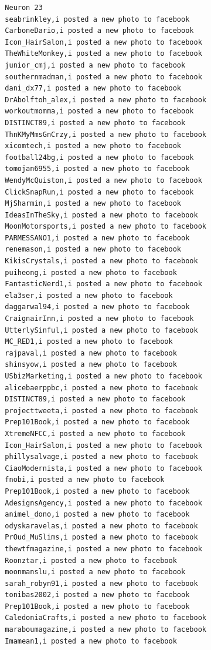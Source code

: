 \begin{figure}[htpb]
\begin{verbatim}
  Neuron 23
  seabrinkley,i posted a new photo to facebook
  CarboneDario,i posted a new photo to facebook
  Icon_HairSalon,i posted a new photo to facebook
  TheWhiteMonkey,i posted a new photo to facebook
  junior_cmj,i posted a new photo to facebook
  southernmadman,i posted a new photo to facebook
  dani_dx77,i posted a new photo to facebook
  DrAbolftoh_alex,i posted a new photo to facebook
  workoutmomma,i posted a new photo to facebook
  DISTINCT89,i posted a new photo to facebook
  ThnKMyMmsGnCrzy,i posted a new photo to facebook
  xicomtech,i posted a new photo to facebook
  football24bg,i posted a new photo to facebook
  tomojan6955,i posted a new photo to facebook
  WendyMcQuiston,i posted a new photo to facebook
  ClickSnapRun,i posted a new photo to facebook
  MjSharmin,i posted a new photo to facebook
  IdeasInTheSky,i posted a new photo to facebook
  MoonMotorsports,i posted a new photo to facebook
  PARMESSANO1,i posted a new photo to facebook
  renemason,i posted a new photo to facebook
  KikisCrystals,i posted a new photo to facebook
  puiheong,i posted a new photo to facebook
  FantasticNerd1,i posted a new photo to facebook
  ela3ser,i posted a new photo to facebook
  daggarwal94,i posted a new photo to facebook
  CraignairInn,i posted a new photo to facebook
  UtterlySinful,i posted a new photo to facebook
  MC_RED1,i posted a new photo to facebook
  rajpaval,i posted a new photo to facebook
  shinsyow,i posted a new photo to facebook
  USbizMarketing,i posted a new photo to facebook
  alicebaerppbc,i posted a new photo to facebook
  DISTINCT89,i posted a new photo to facebook
  projecttweeta,i posted a new photo to facebook
  Prep101Book,i posted a new photo to facebook
  XtremeNFCC,i posted a new photo to facebook
  Icon_HairSalon,i posted a new photo to facebook
  phillysalvage,i posted a new photo to facebook
  CiaoModernista,i posted a new photo to facebook
  fnobi,i posted a new photo to facebook
  Prep101Book,i posted a new photo to facebook
  AdesignsAgency,i posted a new photo to facebook
  animel_dono,i posted a new photo to facebook
  odyskaravelas,i posted a new photo to facebook
  PrOud_MuSlims,i posted a new photo to facebook
  thewtfmagazine,i posted a new photo to facebook
  Roonztar,i posted a new photo to facebook
  moonmanslu,i posted a new photo to facebook
  sarah_robyn91,i posted a new photo to facebook
  tonibas2002,i posted a new photo to facebook
  Prep101Book,i posted a new photo to facebook
  CaledoniaCrafts,i posted a new photo to facebook
  maraboumagazine,i posted a new photo to facebook
  Imamean1,i posted a new photo to facebook

\end{verbatim}
\end{figure}
